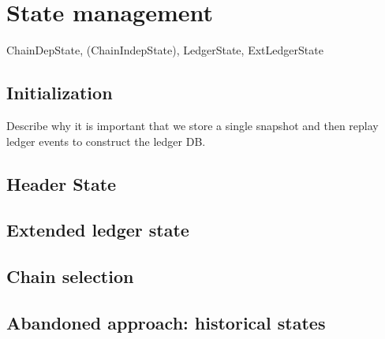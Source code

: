 \chapter{State management}
\label{state}

ChainDepState, (ChainIndepState), LedgerState, ExtLedgerState

\section{Initialization}
\label{state:initialization}

Describe why it is important that we store a single snapshot and then replay
ledger events to construct the ledger DB.

\section{Header State}
\label{state:header}

\section{Extended ledger state}
\label{state:extended}

\section{Chain selection}
\label{state:chainselection}

\section{Abandoned approach: historical states}

